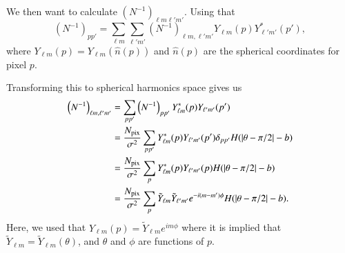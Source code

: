 \documentclass[twocolumn]{../common/aa}
\begin{document}
We then want to calculate $\left(N^{-1}\right)_{\ell m\ell'm'}$. Using that
$$
\left(N^{-1}\right)_{pp'} = \sum_{\ell m}\sum_{\ell' m'} \left(N^{-1}\right)_{\ell m, \ell'm'} Y_{\ell m}\left(p\right)Y^*_{\ell' m'}\left(p'\right),
$$
where $Y_{\ell m}\left(p\right) = Y_{\ell m}\left(\hat{n}(p)\right)$ and $\hat{n}(p)$ are the spherical coordinates for pixel $p$.

Transforming this to spherical harmonics space gives us
\begin{align}
\nonumber
\left(N^{-1}\right)_{\ell m, \ell' m'} &= \sum_{p p'}\left(N^{-1}\right)_{pp'}Y^{*}_{\ell m}(p)Y_{\ell' m'}(p')\\
\nonumber
&= \frac{N_{\mathrm{pix}}}{\sigma^2}\sum_{p p'} Y^{*}_{\ell m}(p)Y_{\ell' m'}(p') \delta_{pp'} H(|\theta -\pi/2|-b)\\
\nonumber
&= \frac{N_{\mathrm{pix}}}{\sigma^2}\sum_{p } Y^{*}_{\ell m}(p)Y_{\ell' m'}(p) H(|\theta -\pi/2|-b)\\
&= \frac{N_{\mathrm{pix}}}{\sigma^2}\sum_p \Tilde{Y}_{\ell m}\Tilde{Y}_{\ell' m'} e^{-i(m-m')\phi} H(|\theta -\pi/2|-b).
\end{align}
Here, we used that $Y_{\ell m}(p) = \tilde{Y}_{\ell m} e^{im\phi}$ where it is implied that $\tilde{Y}_{\ell m}=\tilde{Y}_{\ell m}(\theta)$, and $\theta$ and $\phi$ are functions of $p$.
\end{document}
